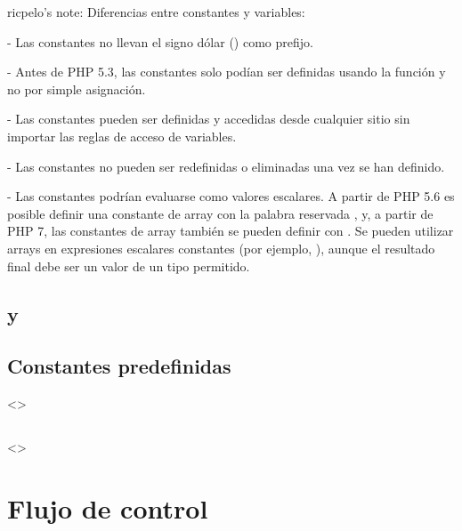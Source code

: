 \documentclass[a4paper,12pt,spanish]{sphinxmanual}
\begin{document}
\begin{DUlineblock}{0em}
\item[] ricpelo’s note: Diferencias entre constantes y variables:
\item[] - Las constantes no llevan el signo dólar (\sphinxcode{\$}) como prefijo.
\item[] - Antes de PHP 5.3, las constantes solo podían ser definidas usando la
función  y no por simple asignación.
\item[] - Las constantes pueden ser definidas y accedidas desde cualquier
sitio sin importar las reglas de acceso de variables.
\item[] - Las constantes no pueden ser redefinidas o eliminadas una vez se han
definido.
\item[] - Las constantes podrían evaluarse como valores escalares. A partir de
PHP 5.6 es posible definir una constante de array con la palabra
reservada , y, a partir de PHP 7, las constantes de array
también se pueden definir con . Se pueden utilizar arrays
en expresiones escalares constantes (por ejemplo,
), aunque el resultado final debe ser
un valor de un tipo permitido.
\end{DUlineblock}


\subsection{ y }
\label{\detokenize{php:define-y-const}}

\subsection{Constantes predefinidas}
\label{\detokenize{php:constantes-predefinidas}}
\textless{}\textgreater{}


\subsection{}
\label{\detokenize{php:defined}}
\textless{}\textgreater{}


\section{Flujo de control}
\label{\detokenize{php:flujo-de-control}}
\end{document}
